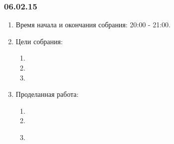 \subsubsection{06.02.15}
\begin{enumerate}
	
	\item Время начала и окончания собрания: 20:00 - 21:00.
	
	\item Цели собрания: 
	\begin{enumerate}
		
		\item 
		
		\item 
		
        \item 
		
	\end{enumerate}

	\item Проделанная работа:
	\begin{enumerate}
		
		\item 
		
		\item 
		
        \item 
		
        \begin{figure}[H]
	  	  \begin{minipage}[h]{0.2\linewidth}
	  	    \center  
	  	  \end{minipage}
	  	  \begin{minipage}[h]{0.6\linewidth}
	  		\caption{}
	  	  \end{minipage}
	   \end{figure}


\end{enumerate}
\end{enumerate}
